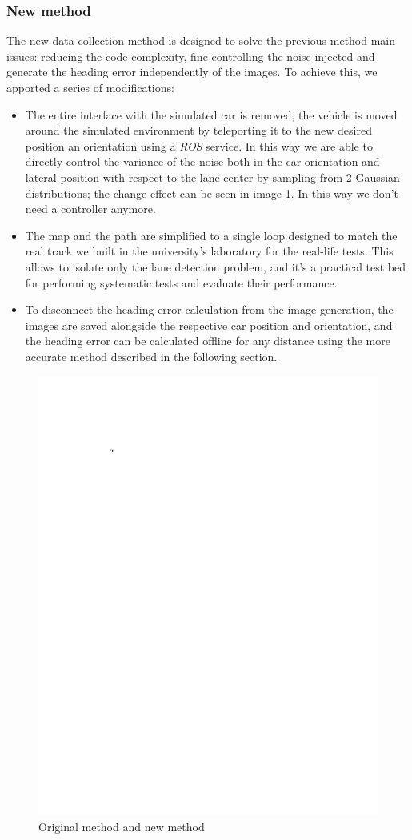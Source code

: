 \documentclass[a4paper,12pt,sort&compress]{article}
\begin{document}
\subsubsection*{New method}
The new data collection method is designed to solve the previous method main issues: reducing the
code complexity, fine controlling the noise injected and generate the heading error independently of
the images. To achieve this, we apported a series of modifications:
\begin{itemize}
    \item The entire interface with the simulated car is removed, the vehicle is moved around the
    simulated environment by teleporting it to the new desired position an orientation using a
    \textit{ROS} service. In this way we are able to directly control the variance of the noise both
    in the car orientation and lateral position with respect to the lane center by sampling from 2
    Gaussian distributions; the change effect can be seen in image \ref*{fig:original_vs_old}. In
    this way we don't  need a controller anymore.
    \item The map and the path are simplified to a single loop designed to match the real track we
    built in the university's laboratory for the real-life tests. This allows to isolate only the
    lane detection problem, and it's a practical test bed for performing systematic tests and
    evaluate their performance. 
    \item To disconnect the heading error calculation from the image generation, the images are
    saved alongside the respective car position and orientation, and the heading error can be
    calculated offline for any distance using the more accurate method described in the following
    section.   
\end{itemize}


\begin{figure}
    \centering
    \includegraphics[width=0.6\linewidth]{a.pdf}
    \caption{Original method and new method}
    \label{fig:original_vs_old}
\end{figure}
\end{document}
